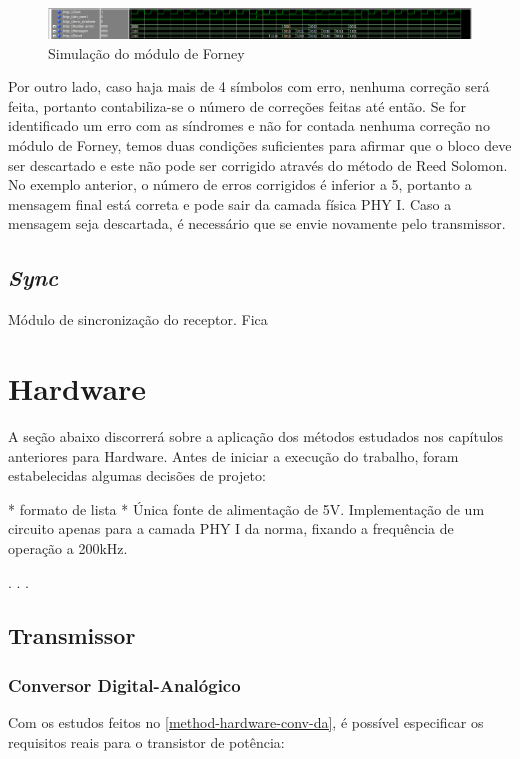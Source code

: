 	\begin{figure}[!htb]
		\caption{\label{fig_forney_sim} Simulação do módulo de Forney}
		\centering
		\includegraphics[width=1\textwidth]{RS/Sim_forney.PNG}
		\legend{}
	\end{figure}
	
	Por outro lado, caso haja mais de 4 símbolos com erro, nenhuma correção será feita, portanto contabiliza-se o número de correções feitas até então. Se for identificado um erro com as síndromes e não for contada nenhuma correção no módulo de Forney, temos duas condições suficientes para afirmar que o bloco deve ser descartado e este não pode ser corrigido através do método de Reed Solomon. No exemplo anterior, o número de erros corrigidos é inferior a 5, portanto a mensagem final está correta e pode sair da camada física PHY I. Caso a mensagem seja descartada, é necessário que se envie novamente pelo transmissor.
	
	\subsection{\textit{Sync}}
	
	Módulo de sincronização do receptor. Fica 
	
	
	\section{Hardware}
	A seção abaixo discorrerá sobre a aplicação dos métodos estudados nos capítulos anteriores para Hardware.
	Antes de iniciar a execução do trabalho, foram estabelecidas algumas decisões de projeto:
	
	* formato de lista *
	Única fonte de alimentação de 5V.
	Implementação de um circuito apenas para a camada PHY I da norma, fixando a frequência de operação a 200kHz.
	
	. . .
	
	
	\subsection{Transmissor}
	
	\subsubsection{Conversor Digital-Analógico}
	Com os estudos feitos no \autoref{method-hardware-conv-da}, é possível especificar os requisitos reais para o transistor de potência:

